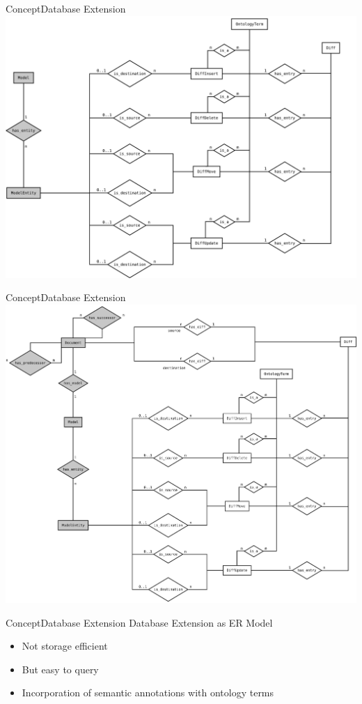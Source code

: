 \begin{frame}{Concept}{Database Extension}
	\centering
	\includegraphics[width=\linewidth,height=\textheight,keepaspectratio]{figures/er-part-3.pdf}
\end{frame}

\begin{frame}{Concept}{Database Extension}
	\centering
	\includegraphics[width=\linewidth,height=\textheight,keepaspectratio]{../tex/resources/db-concept-er.pdf}
\end{frame}

\begin{frame}{Concept}{Database Extension}
	{\Large Database Extension as ER Model}
	\\[2.5em]
	\begin{itemize}
		\item Not storage efficient
		\item But easy to query
		\item Incorporation of semantic annotations with ontology terms
	\end{itemize}
\end{frame}

